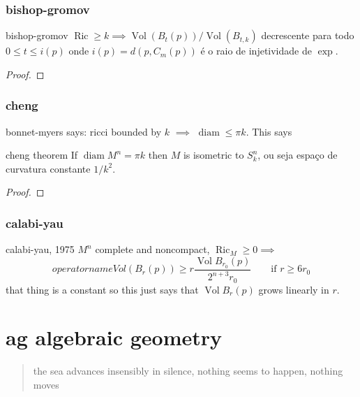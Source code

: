 \subsection{bishop-gromov}

\begin{thing6}{bishop-gromov}\leavevmode
\(\operatorname{Ric}\geq k \implies \operatorname{Vol}(B_t(p))/\operatorname{Vol}(B_{t,k})\) decrescente para todo \(0 \leq  t \leq  i(p)\) onde \(i(p) =d(p,C_m(p))\) é o raio de injetividade de \(\operatorname{exp}\).
\end{thing6}

\begin{proof}\leavevmode

\end{proof}

\subsection{cheng}
bonnet-myers says: ricci bounded by \(k\) \(\implies \) \(\operatorname{diam}\leq \pi k\). This says
\begin{thing6}{cheng theorem}\leavevmode
If \(\operatorname{diam}M^n=\pi k\) then \(M\) is isometric to \(S^n_k\), ou seja espaço de curvatura constante \(1/k^2\).
\end{thing6}

\begin{proof}\leavevmode

\end{proof}

\subsection{calabi-yau}

\begin{thing6}{calabi-yau, 1975}\leavevmode
\(M^n\) complete and noncompact, \(\operatorname{Ric}_M \geq 0 \implies\)\[operatorname{Vol}(B_r(p)) \geq r \frac{\operatorname{Vol} B_{r_0}(p)}{2^{n+3}r_0}\qquad \text{if } r\geq 6r_0\]
that thing is a constant so this just says that \(\operatorname{Vol}B_r(p)\) grows linearly in \(r\).
\end{thing6}


\clearpage
\chapter{ag algebraic geometry}

\begin{quotation}
	the sea advances insensibly in silence, nothing seems to happen, nothing moves
\end{quotation}

